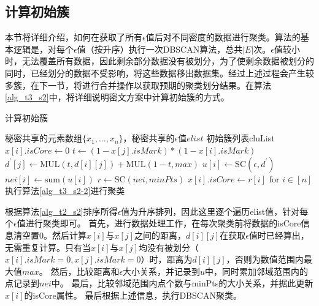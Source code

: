\subsection{计算初始簇}
本节将详细介绍，如何在获取了所有$\epsilon$值后对不同密度的数据进行聚类。算法的基本逻辑是，对每个$\epsilon$值（按升序）执行一次DBSCAN算法，总共$|E|$次。$\epsilon$值较小时，无法覆盖所有数据，因此剩余部分数据没有被划分，为了使剩余数据被划分的同时，已经划分的数据不受影响，将这些数据移出数据集。经过上述过程会产生较多簇，在下一节，将进行合并操作以获取预期的聚类划分结果。在算法\ref{alg_t3_s2}中，将详细说明密文方案中计算初始簇的方式。

\begin{algorithm}[htbp]
	\renewcommand{\algorithmicrequire}{\textbf{输入:}}
	\renewcommand{\algorithmicensure}{\textbf{输出:}}
	\caption{计算初始簇}
	\label{alg_t3_s2} %
	\begin{algorithmic}[1]
		\REQUIRE 秘密共享的元素数组$ \{x_1,...,x_n\} $，秘密共享的$\epsilon$值$ elist $
		\ENSURE 初始簇列表cluList
		\STATE $x[i].isCore \leftarrow 0$ %
		\STATE $t \leftarrow ( 1- x[j].isMark) * (1-x[i].isMark)$
		\STATE $d^{\prime}[j] \leftarrow \text{MUL}(t,d[i][j])+\text{MUL}(1-t,max)$
		\ENDFOR
		\STATE $u[i] \leftarrow \text{SC}(\epsilon, d^{\prime})$
		\STATE $nei[i] \leftarrow \text{sum}(u[i])$
		\ENDFOR
		\STATE $r \leftarrow \text{SC}(nei, minPts)$
		\STATE $x[i].isCore \leftarrow r[i]$ for $i\in[n]$
		\STATE 执行算法\ref{alg_t3_s2-2}进行聚类
		\ENDFOR
	\end{algorithmic}
\end{algorithm}

根据算法\ref{alg_t2_s2}排序所得$\epsilon$值为升序排列，因此这里逐个遍历elist值，针对每个$\epsilon$值进行聚类即可。
首先，进行数据处理工作，在每次聚类前将数据的isCore信息清空置0。然后计算$x[i]$与$x[j]$之间的距离，$d[i][j]$在获取$\epsilon$值时已经算出，无需重复计算。只有当$x[i]$与$x[j]$均没有被划分（$x[i].isMark=0,x[j].isMark=0$）时，距离为$d[i][j]$，否则为数值范围内最大值$max$。
然后，比较距离和$\epsilon$大小关系，并记录到$u$中，同时累加邻域范围内的点记录到$nei$中。
最后，比较邻域范围内点个数与minPts的大小关系，并据此更新$x[i]$的isCore属性。
最后根据上述信息，执行DBSCAN聚类。

